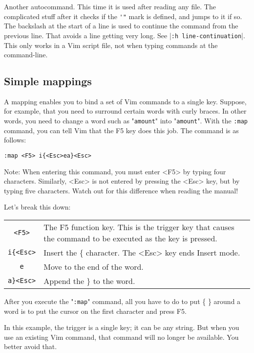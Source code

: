 Another autocommand.
This time it is used after reading any file.
The complicated stuff after it checks if the \verb!'"! mark is defined, and jumps to it if so.
The backslash at the start of a line is used to continue the command from the previous line.
That avoids a line getting very long.
See |\verb!:h line-continuation!|.
This only works in a Vim script file, not when typing commands at the command-line.

\subsection{Simple mappings}
\label{Simple mappings}
A mapping enables you to bind a set of Vim commands to a single key.
Suppose, for example, that you need to surround certain words with curly braces.
In other words, you need to change a word such as "\verb!amount!" into "{\verb!amount!}".
With the \verb!:map! command, you can tell Vim that the F5 key does this job.
The command is as follows:

 \begin{Verbatim}[samepage=true]
 :map <F5> i{<Esc>ea}<Esc>
 \end{Verbatim}
 
Note: When entering this command, you must enter <F5> by typing four characters.
Similarly, <Esc> is not entered by pressing the <Esc> key, but by typing five characters.
Watch out for this difference when reading the manual!

Let's break this down:
\begin{longtable}{c l}
				\verb!<F5>! & The F5 function key.
				This is the trigger key that causes the command to be executed as the key is pressed.\\

				\verb!i{<Esc>! & Insert the \{ character.
				The <Esc> key ends Insert mode.\\

				\verb!e! & Move to the end of the word.\\

				\verb!a}<Esc>! & Append the \} to the word.\\
\end{longtable}

After you execute the "\verb!:map!" command, all you have to do to put \{ \} around a word is to put the cursor on the first character and press F5.

In this example, the trigger is a single key; it can be any string.
But when you use an existing Vim command, that command will no longer be available.
You better avoid that.

